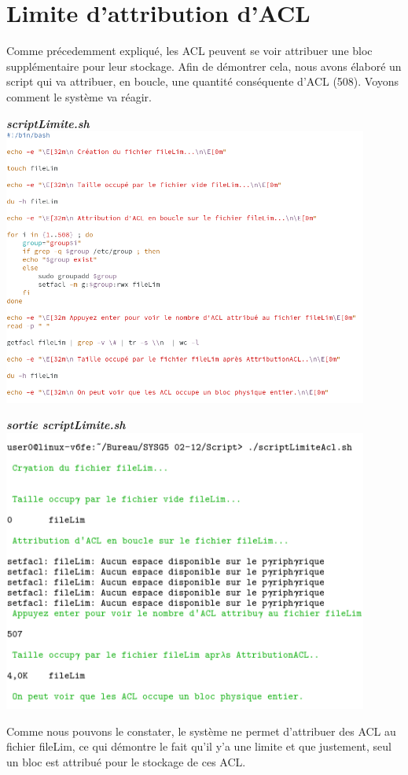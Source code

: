 \documentclass{article}
\begin{document}
\newpage

\section{Limite d'attribution d'ACL}
Comme précedemment expliqué, les ACL peuvent se voir attribuer une bloc supplémentaire pour leur stockage. Afin de démontrer cela, nous avons élaboré un script qui va attribuer, en boucle, une quantité conséquente d'ACL (508). Voyons comment le système va réagir.
\begin{center}
    \textbf{\textit{scriptLimite.sh}}
\includegraphics[width=12cm]{images/scriptLimiteAcl.png}
\end{center}
\newpage
\begin{center}
    \textbf{\textit{sortie scriptLimite.sh}}
\includegraphics[width=12cm]{images/sortieScriptLimite.png}
\end{center}
Comme nous pouvons le constater, le système ne permet d'attribuer des ACL au fichier fileLim, ce qui démontre le fait qu'il y'a une limite et que justement, seul un bloc est attribué pour le stockage de ces ACL.
\end{document}
